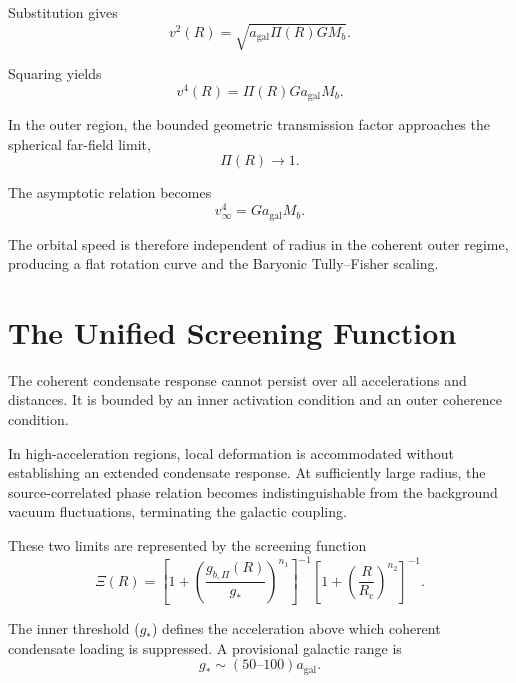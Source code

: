 Substitution gives
\begin{equation}
    v^2(R) = \sqrt{ a_{\mathrm{gal}}\Pi(R)GM_b }.
\end{equation}

Squaring yields
\begin{equation}
    v^4(R) = \Pi(R) G a_{\mathrm{gal}} M_b.
\end{equation}

In the outer region, the bounded geometric transmission factor approaches the spherical far-field limit,
\begin{equation}
    \Pi(R) \rightarrow 1.
\end{equation}

The asymptotic relation becomes
\begin{equation}
    v_\infty^4 = G a_{\mathrm{gal}} M_b.
\end{equation}

The orbital speed is therefore independent of radius in the coherent outer regime, producing a flat rotation curve and the Baryonic Tully--Fisher scaling.

\section{The Unified Screening Function}

The coherent condensate response cannot persist over all accelerations and distances. It is bounded by an inner activation condition and an outer coherence condition.

In high-acceleration regions, local deformation is accommodated without establishing an extended condensate response. At sufficiently large radius, the source-correlated phase relation becomes indistinguishable from the background vacuum fluctuations, terminating the galactic coupling.

These two limits are represented by the screening function
\begin{equation}
    \Xi(R) = \left[ 1+ \left( \frac{g_{b,\Pi}(R)}{g_*} \right)^{n_1} \right]^{-1} \left[ 1+ \left( \frac{R}{R_{\mathrm{c}}} \right)^{n_2} \right]^{-1}.
\end{equation}

The inner threshold ($g_*$) defines the acceleration above which coherent condensate loading is suppressed. A provisional galactic range is
\begin{equation}
    g_* \sim (50\text{--}100) a_{\mathrm{gal}}.
\end{equation}

